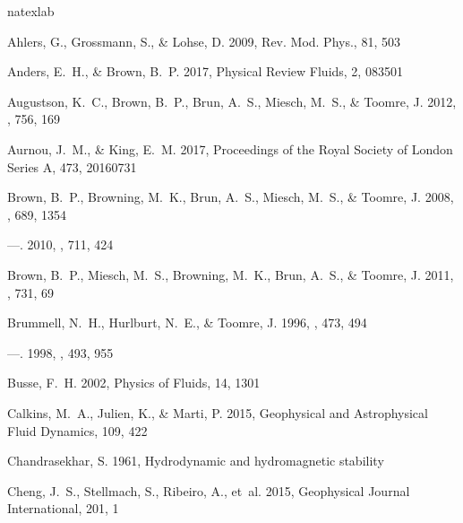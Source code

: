 \documentclass[twocolumn, amsmath, amsfonts, amssymb]{aastex62}
\begin{document}
\begin{thebibliography}{}
\expandafter\ifx\csname natexlab\endcsname\relax\def\natexlab#1{#1}\fi

Ahlers, G., Grossmann, S., \& Lohse, D. 2009, Rev. Mod. Phys., 81, 503

{Anders}, E.~H., \& {Brown}, B.~P. 2017, Physical Review Fluids, 2, 083501

{Augustson}, K.~C., {Brown}, B.~P., {Brun}, A.~S., {Miesch}, M.~S., \&
  {Toomre}, J. 2012, \apj, 756, 169

{Aurnou}, J.~M., \& {King}, E.~M. 2017, Proceedings of the Royal Society of
  London Series A, 473, 20160731

{Brown}, B.~P., {Browning}, M.~K., {Brun}, A.~S., {Miesch}, M.~S., \& {Toomre},
  J. 2008, \apj, 689, 1354

---. 2010, \apj, 711, 424

{Brown}, B.~P., {Miesch}, M.~S., {Browning}, M.~K., {Brun}, A.~S., \& {Toomre},
  J. 2011, \apj, 731, 69

{Brummell}, N.~H., {Hurlburt}, N.~E., \& {Toomre}, J. 1996, \apj, 473, 494

---. 1998, \apj, 493, 955

{Busse}, F.~H. 2002, Physics of Fluids, 14, 1301

{Calkins}, M.~A., {Julien}, K., \& {Marti}, P. 2015, Geophysical and
  Astrophysical Fluid Dynamics, 109, 422

{Chandrasekhar}, S. 1961, {Hydrodynamic and hydromagnetic stability}

{Cheng}, J.~S., {Stellmach}, S., {Ribeiro}, A., {et~al.} 2015, Geophysical
  Journal International, 201, 1


\end{thebibliography}
\end{document}
